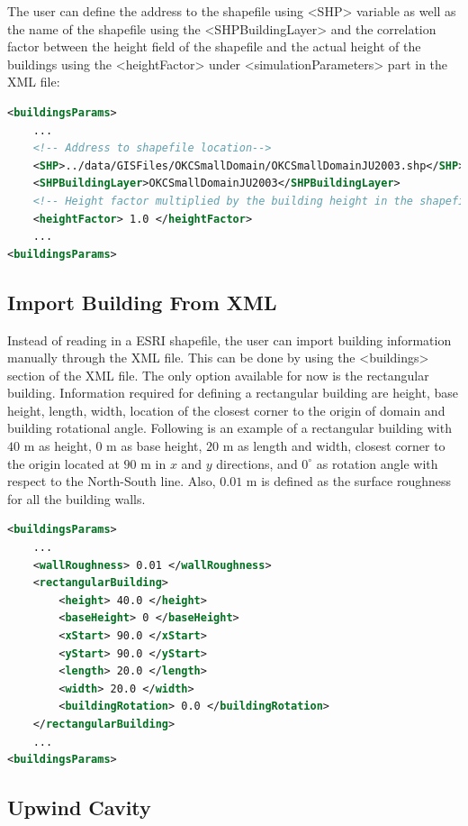 The user can define the address to the shapefile using <SHP> variable as well as the name of the shapefile using the <SHPBuildingLayer> and the correlation factor between the height field of the shapefile and the actual height of the buildings using the <heightFactor> under <simulationParameters> part in the XML file:

\begin{lstlisting}[language=XML]
<buildingsParams>
	...
	<!-- Address to shapefile location-->
	<SHP>../data/GISFiles/OKCSmallDomain/OKCSmallDomainJU2003.shp</SHP>
	<SHPBuildingLayer>OKCSmallDomainJU2003</SHPBuildingLayer>
	<!-- Height factor multiplied by the building height in the shapefile (default = 1.0)-->
	<heightFactor> 1.0 </heightFactor>
	... 				
<buildingsParams>
\end{lstlisting}

\subsection{Import Building From XML}
\label{sec:building}

Instead of reading in a ESRI shapefile, the user can import building information manually through the XML file. This can be done by using the <buildings> section of the XML file. The only option available for now is the rectangular building. Information required for defining a rectangular building are height, base height, length, width, location of the closest corner to the origin of domain and building rotational angle. Following is an example of a rectangular building with $40$ m as height, $0$ m as base height, $20$ m as length and width, closest corner to the origin located at $90$ m in $x$ and $y$ directions, and $0^{\circ}$ as rotation angle with respect to the North-South line. Also, $0.01$ m is defined as the surface roughness for all the building walls.

\begin{lstlisting}[language=XML]
<buildingsParams>
	...
	<wallRoughness> 0.01 </wallRoughness>
	<rectangularBuilding>
		<height> 40.0 </height>
		<baseHeight> 0 </baseHeight>
		<xStart> 90.0 </xStart>
		<yStart> 90.0 </yStart>
		<length> 20.0 </length>
		<width> 20.0 </width>
		<buildingRotation> 0.0 </buildingRotation>
	</rectangularBuilding>
	... 				
<buildingsParams>
\end{lstlisting}

\subsection{Upwind Cavity}\label{upwind-cavity}

